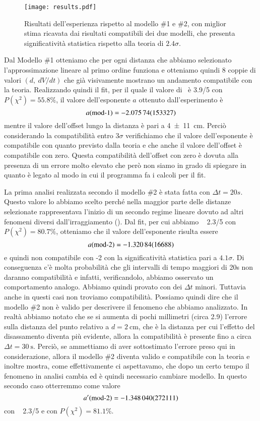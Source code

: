 \documentclass[
    rmp,
    reprint, 
    superscriptaddress, 
    altaffilletter, 
    amsmath, 
    amssymb,
    a4paper]{revtex4-2}
\begin{document}
\begin{figure}
    \texttt{[image: results.pdf]}
    \caption{Risultati dell'esperienza rispetto al modello \#1 e \#2, con miglior stima ricavata dai risultati compatibili dei due modelli, che presenta significatività statistica rispetto alla teoria di $2.4\sigma$.}
    \label{fig:results}
\end{figure}


Dal Modello \#1 otteniamo che per ogni distanza che abbiamo selezionato l'approssimazione lineare al primo ordine funziona e otteniamo quindi 8 coppie di valori $(d,~dV/dt)$ che già visivamente mostrano un andamento compatibile con la teoria. Realizzando quindi il fit, per il quale il valore di \ChiNdf~è 3.9/5 con $P(\chi^2)=55.8\%$, il valore dell'esponente $a$ ottenuto dall'esperimento è \[a\text{(mod-1)}=\num{-2.07574 +- 1.53327}\] mentre il valore dell'offset lungo la distanza è pari a \SI[round-mode=none]{4 +- 11}{\centi\metre}. Perciò considerando la compatibilità entro $3\sigma$ verifichiamo che il valore dell'esponente è compatibile con quanto previsto dalla teoria e che anche il valore dell'offset è compatibile con zero. Questa compatibilità dell'offset con zero è dovuta alla presenza di un errore molto elevato che però non siamo in grado di spiegare in quanto è legato al modo in cui il programma fa i calcoli per il fit.

La prima analisi realizzata secondo il modello \#2 è stata fatta con $\Delta t=20s$. Questo valore lo abbiamo scelto perché nella maggior parte delle distanze selezionate rappresentava l'inizio di un secondo regime lineare dovuto ad altri fenomeni diversi dall'irraggiamento (). Dal fit, per cui abbiamo \ChiNdf~ 2.3/5 con $P(\chi^2)=80.7\%$, otteniamo che il valore dell'esponente risulta essere \[a\text{(mod-2)}=\num{-1.32084 +- 0.16688}\] e quindi non compatibile con -2 con la significatività statistica pari a $4.1\sigma$. Di conseguenza c'è molta probabilità che gli intervalli di tempo maggiori di 20s non daranno compatibilità e infatti, verificandolo, abbiamo osservato un comportamento analogo. Abbiamo quindi provato con dei $\Delta t$ minori. Tuttavia anche in questi casi non troviamo compatibilità. Possiamo quindi dire che il modello \#2 non è valido per descrivere il fenomeno che abbiamo analizzato. In realtà abbiamo notato che se si aumenta di pochi millimetri (circa \num{2.9}) l'errore sulla distanza del punto relativo a $d=\SI{2}{\centi\metre}$, che è la distanza per cui l'effetto del disassamento diventa più evidente, allora la compatibilità è presente fino a circa $\Delta t=\SI{30}{\second}$. Perciò, se ammettiamo di aver sottostimato l'errore preso qui in considerazione, allora il modello \#2 diventa valido e compatibile con la teoria e inoltre mostra, come effettivamente ci aspettavamo, che dopo un certo tempo il fenomeno in analisi cambia ed è quindi necessario cambiare modello. In questo secondo caso otterremmo come valore \[a'\text{(mod-2)}=\num{-1.34804 +- 0.272111}\] con \ChiNdf~ 2.3/5 e con $P(\chi^2)=81.1\%$. 
\end{document}
